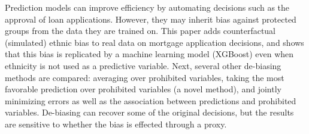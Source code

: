 Prediction models can improve efficiency by automating decisions such as the approval of loan applications. However, they may inherit bias against protected groups from the data they are trained on. This paper adds counterfactual (simulated) ethnic bias to real data on mortgage application decisions, and shows that this bias is replicated by a machine learning model (XGBoost) even when ethnicity is not used as a predictive variable. Next, several other de-biasing methods are compared: averaging over prohibited variables, taking the most favorable prediction over prohibited variables (a novel method), and jointly minimizing errors as well as the association between predictions and prohibited variables. De-biasing can recover some of the original decisions, but the results are sensitive to whether the bias is effected through a proxy.